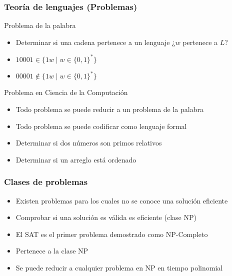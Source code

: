 \documentclass{beamer}
\begin{document}
\begin{frame}
    \frametitle{Teoría de lenguajes (Problemas)}
    
    \begin{block}{Problema de la palabra}
        \begin{itemize}
            \item Determinar si una cadena pertenece a un lenguaje ¿$w$ pertenece a $L$?
                  \pause
            \item $10001\in \{1w\mid w\in\{0,1\}^*\}$
                  \pause
            \item $00001\notin \{1w\mid w\in\{0,1\}^*\}$
        \end{itemize}
        
    \end{block}
    
    \pause
    
    \begin{block}{Problema en Ciencia de la Computación}
        \begin{itemize}
            \item Todo problema se puede reducir a un problema de la palabra
                  \pause
            \item Todo problema se puede codificar como lenguaje formal
                  \pause
            \item Determinar si dos números son primos relativos
                  \pause
            \item Determinar si un arreglo está ordenado
        \end{itemize}
    \end{block}
    
\end{frame}

\begin{frame}
    \frametitle{Clases de problemas}
    
    \begin{itemize}
        \item Existen problemas para los cuales no se conoce una solución eficiente
              \pause
        \item Comprobar si una solución es válida es eficiente (clase NP)
              \pause  
        \item El SAT es el primer problema demostrado como NP-Completo
              \pause
        \item Pertenece a la clase NP
              \pause
        \item Se puede reducir a cualquier problema en NP en tiempo polinomial
    \end{itemize}
    
\end{frame}
\end{document}
